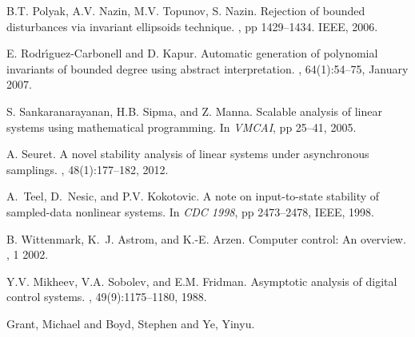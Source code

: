 \begin{thebibliography}{10}
B.T. Polyak, A.V. Nazin, M.V. Topunov, S. Nazin.
\newblock Rejection of bounded disturbances via invariant ellipsoids technique.
, pp 1429--1434. IEEE, 2006.

E. Rodr\'{\i}guez-Carbonell and D. Kapur.
\newblock Automatic generation of polynomial invariants of bounded degree using
  abstract interpretation.
, 64(1):54--75, January 2007.

S. Sankaranarayanan, H.B. Sipma, and Z. Manna.
\newblock Scalable analysis of linear systems using mathematical programming.
\newblock In {\em VMCAI}, pp 25--41, 2005.

A. Seuret.
\newblock A novel stability analysis of linear systems under asynchronous
  samplings.
, 48(1):177--182, 2012.

A.~Teel, D.~Nesic, and P.V. Kokotovic.
\newblock A note on input-to-state stability of sampled-data nonlinear systems.
\newblock In {\em CDC 1998}, pp 2473--2478, IEEE, 1998.

B. Wittenmark, K.~J. Astrom, and K.-E. Arzen.
\newblock Computer control: An overview.
, 1 2002.

Y.V. Mikheev, V.A. Sobolev, and E.M. Fridman.
\newblock Asymptotic analysis of digital control systems.
, 49(9):1175--1180, 1988.

Grant, Michael and Boyd, Stephen and Ye, Yinyu.
  

\end{thebibliography}






























